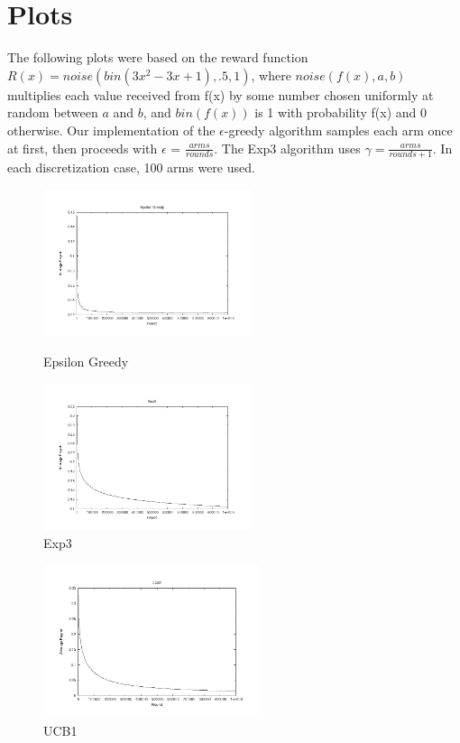 \documentclass{article}
\begin{document}
\section{Plots}
The following plots were based on the reward function
$R(x) = noise(bin(3x^2 -3x + 1), .5, 1)$, where $noise(f(x), a, b)$
multiplies each value received from f(x) by some number chosen uniformly
at random between $a$ and $b$, and $bin(f(x))$ is 1 with probability
f(x) and 0 otherwise.  Our implementation of the $\epsilon$-greedy 
algorithm samples each arm once at first, then proceeds with
$\epsilon$ = $\frac{arms}{rounds}$.  The Exp3 algorithm uses
$\gamma = \frac{arms}{rounds + 1}$.  In each discretization case, 100
arms were used.


\begin{figure}[ht]
 \begin{minipage}[b]{.5\linewidth}
 \centering
 \includegraphics[width=230px]{./e_greed.png}
 \caption{Epsilon Greedy}
 \label{e_greed}
 \end{minipage}
 \begin{minipage}[b]{.5\linewidth}
 \centering
 \includegraphics[width=230px]{./exp3.png}
 \caption{Exp3}
 \label{exp3}
 \end{minipage}
\end{figure}

\begin{figure}[ht]
 \begin{minipage}[b]{.5\linewidth}
 \centering
 \includegraphics[width=240px]{./ucb1.png}
 \caption{UCB1}
 \label{ucb1}
 \end{minipage}
\end{figure}
\end{document}
